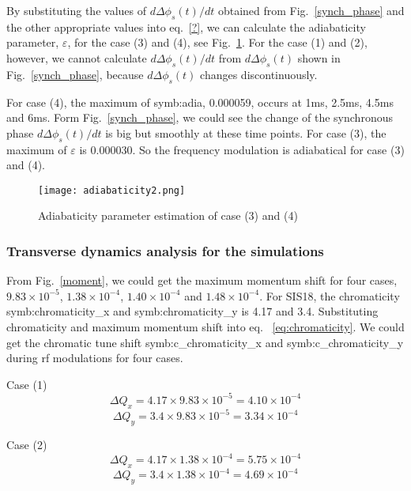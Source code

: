 \begin{itemize}
By substituting the values of $d\Delta \phi_s(t)/dt$ obtained from Fig.~\ref{synch_phase} and the other appropriate values into eq.~\ref{?}, we can calculate the adiabaticity parameter, $\varepsilon$, for the case (3) and (4), see Fig.~\ref{adiabaticity2}. For the case (1) and (2), however, we cannot calculate $d\Delta \phi_s(t)/dt$ from $d\Delta \phi_s(t)$  shown in Fig.~\ref{synch_phase}, because $d\Delta \phi_s(t)$ changes discontinuously. 

For case (4), the maximum of \gls{symb:adia}, 0.000059, occurs at 1ms, 2.5ms, 4.5ms and 6ms. Form Fig.~\ref{synch_phase}, we could see the change of the synchronous phase $d\Delta \phi_s(t)/dt$  is big but smoothly at these time points. For case (3), the maximum of $\varepsilon$ is 0.000030. So the frequency modulation is adiabatical for case (3) and (4).


\begin{figure}[!htb]
   \centering   
   \texttt{[image: adiabaticity2.png]}
   \caption{Adiabaticity parameter estimation of case (3) and (4)}
   \label{adiabaticity2}
\end{figure}
\end{itemize}
\subsubsection{Transverse dynamics analysis for the simulations}
From Fig.~\ref{moment}, we could get the maximum momentum shift for four cases, $9.83 \times 10^{-5}$, $1.38 \times 10^{-4}$, $1.40 \times 10^{-4}$ and $1.48 \times 10^{-4}$. For SIS18, the chromaticity \gls{symb:chromaticity_x} and \gls{symb:chromaticity_y} is 4.17 and 3.4. Substituting chromaticity and maximum momentum shift into eq. ~\ref{eq:chromaticity}. We could get the chromatic tune shift \gls{symb:c_chromaticity_x} and \gls{symb:c_chromaticity_y} during rf modulations for four cases. 

Case (1) 
\begin{equation}
\Delta Q_x = 4.17 \times 9.83 \times 10^{-5}=4.10 \times 10^{-4}
\end{equation}
\begin{equation}
\Delta Q_y = 3.4 \times 9.83 \times 10^{-5}=3.34 \times 10^{-4} 
\end{equation}

Case (2)
\begin{equation}
\Delta Q_x = 4.17 \times 1.38 \times 10^{-4}=5.75 \times 10^{-4}
\end{equation}
\begin{equation}
\Delta Q_y = 3.4 \times 1.38 \times 10^{-4}=4.69 \times 10^{-4} 
\end{equation}


